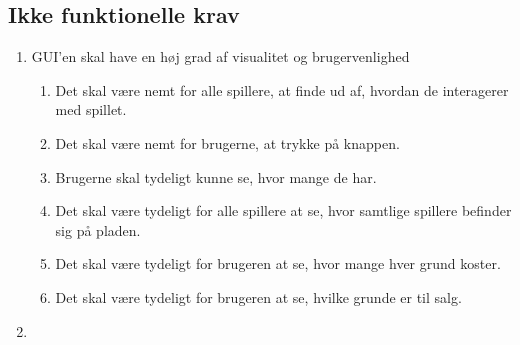 \subsection{Ikke funktionelle krav}
\begin{enumerate}
\subsubsection{Visuelt}
     \item GUI'en skal have en høj grad af visualitet og brugervenlighed
    \begin{enumerate}
        \item Det skal være nemt for alle spillere, at finde ud af, hvordan de interagerer med spillet.
        \item Det skal være nemt for brugerne, at trykke på knappen.
        \item Brugerne skal tydeligt kunne se, hvor mange {} de har.
        \item Det skal være tydeligt for alle spillere at se, hvor samtlige spillere befinder sig på pladen.
        \item Det skal være tydeligt for brugeren at se, hvor mange {} hver grund koster.
        \item Det skal være tydeligt for brugeren at se, hvilke grunde er til salg.
    \end{enumerate}
    \item 
    
\end{enumerate}
